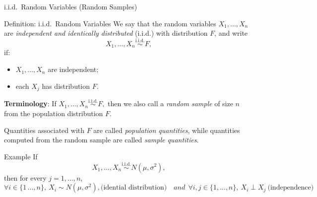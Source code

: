  









\begin{frame}{i.i.d.\ Random Variables (Random Samples)}

\small

\begin{keybox}{Definition: i.i.d.\ Random Variables}
We say that the random variables $X_1,\dots,X_n
$ are \emph{independent and identically distributed} (i.i.d.) with distribution \(F\), and write
\[
X_1,\dots,X_n
\overset{\text{i.i.d.}}{\sim}
F, 
\]
if:
\begin{itemize}
\item \(X_1,\dots,X_n\) are independent;
\item each \(X_j\) has distribution \(F\).
\end{itemize}
\end{keybox}

\textbf{Terminology}: If $X_1,\dots,X_n
\overset{\text{i.i.d.}}{\sim}
F,$ then we also call a \emph{random sample} of size \(n\) from the population distribution \(F\).

Quantities associated with \(F\) are called \emph{population quantities}, while quantities computed from the random sample are called \emph{sample quantities}.

\begin{keybox}{Example}
If
\[
X_1,\dots,X_n
\overset{\text{i.i.d.}}{\sim}
N(\mu,\sigma^2),
\]
then for every \(j=1,\dots,n\),
\begin{equation*}
   \forall i \in \{1\,\dots , n \},\   X_i\sim N(\mu,\sigma^2), \text{(idential distribution)} \quad and  \ \  \forall i,j\in\{1,\dots, n \}, \ X_i \perp X_j \ \text{(independence)}
\end{equation*}


\end{keybox}

\end{frame}

